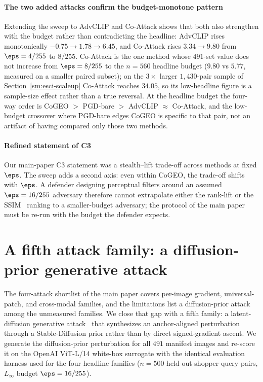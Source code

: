 \paragraph{The two added attacks confirm the budget-monotone pattern} Extending the sweep to AdvCLIP and Co-Attack shows that both also strengthen with the budget rather than contradicting the headline: AdvCLIP rises monotonically $-0.75 \to 1.78 \to 6.45$, and Co-Attack rises $3.34 \to 9.80$ from $\eps = 4/255$ to $8/255$. Co-Attack is the one method whose $491$-set value does not increase from $\eps = 8/255$ to the $n = 560$ headline budget ($9.80$ vs $5.77$, measured on a smaller paired subset); on the $3\times$ larger $1{,}430$-pair sample of Section~\ref{sm:esci-scaleup} Co-Attack reaches $34.05$, so its low-headline figure is a sample-size effect rather than a true reversal. At the headline budget the four-way order is CoGEO $>$ PGD-bare $>$ AdvCLIP $\approx$ Co-Attack, and the low-budget crossover where PGD-bare edges CoGEO is specific to that pair, not an artifact of having compared only those two methods.

\paragraph{Refined statement of C3} Our main-paper C3 statement was a stealth--lift trade-off across methods at fixed $\eps$. The sweep adds a second axis: even within CoGEO, the trade-off shifts with $\eps$. A defender designing perceptual filters around an assumed $\eps = 16/255$ adversary therefore cannot extrapolate either the rank-lift or the SSIM~\cite{wang2004ssim} ranking to a smaller-budget adversary; the protocol of the main paper must be re-run with the budget the defender expects.

\section{A fifth attack family: a diffusion-prior generative attack}
\label{sm:diffprior}

The four-attack shortlist of the main paper covers per-image gradient, universal-patch, and cross-modal families, and the limitations list a diffusion-prior attack among the unmeasured families. We close that gap with a fifth family: a latent-diffusion generative attack~\cite{rombach2022ldm} that synthesizes an anchor-aligned perturbation through a Stable-Diffusion prior rather than by direct signed-gradient ascent. We generate the diffusion-prior perturbation for all $491$ manifest images and re-score it on the OpenAI ViT-L/14 white-box surrogate with the identical evaluation harness used for the four headline families ($n = 500$ held-out shopper-query pairs, $L_\infty$ budget $\eps = 16/255$).

